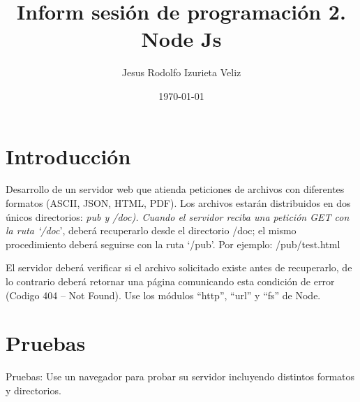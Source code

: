 \documentclass[11pt]{article}
\author{Jesus Rodolfo Izurieta Veliz}
\date{\today}
\title{Inform sesión de programación 2. Node Js}
\begin{document}
\maketitle
\tableofcontents


\section{Introducción}
\label{sec:org745e1cd}
Desarrollo de un servidor web que atienda peticiones de archivos con diferentes formatos (ASCII, JSON, HTML, PDF).
Los archivos estarán distribuidos en dos únicos directorios: \emph{pub y /doc).
Cuando el servidor reciba una petición GET con la ruta ‘/doc}', deberá recuperarlo desde el directorio /doc;
el mismo procedimiento deberá seguirse con la ruta ‘/pub'. Por ejemplo: /pub/test.html

El servidor deberá verificar si el archivo solicitado existe antes de recuperarlo,
de lo contrario deberá retornar una página comunicando esta condición de error (Codigo 404 – Not Found).
Use los módulos “http”, “url” y “fs” de Node.

\section{Pruebas}
\label{sec:org495b983}
Pruebas: Use un navegador para probar su servidor incluyendo distintos formatos y directorios.
\end{document}
